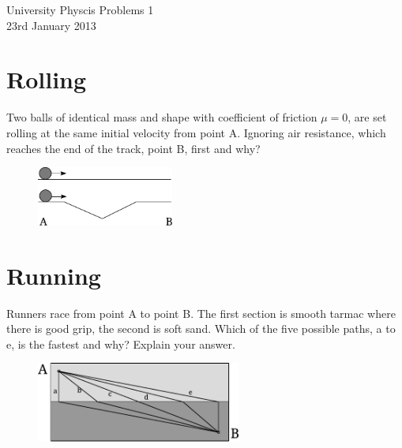 
\makeatletter
\renewcommand{\@maketitle}{
\newpage
 \null
 \vskip 2em%
 \begin{center}%
  {\Large \@title \par}%
 \end{center}%
 \par} \makeatother

\begin{center}
\Huge University Physcis Problems 1\\[1em]
\large 23rd January 2013
\end{center}

\section{Rolling}
Two balls of identical mass and shape with coefficient of friction $\mu=0$, are set rolling at the same initial velocity from point A. Ignoring air resistance, which reaches the end of the track, point B, first and why?
\begin{figure}[ht]
  \centering
  \includegraphics[width=0.4\textwidth]{rolling_balls.pdf}
\end{figure}

\section{Running}
Runners race from point A to point B. The first section is smooth tarmac where there is good grip, the second is soft sand. Which of the five possible paths, a to e, is the fastest and why? Explain your answer.
\begin{figure}[ht]
  \centering
  \includegraphics[width=0.6\textwidth]{runners.pdf}
\end{figure}

